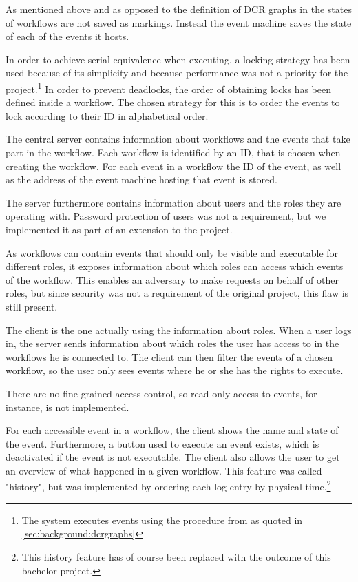 		As mentioned above and as opposed to the definition of DCR graphs in \cite{hildebrandt2011declarative} the states of workflows are not saved as markings. Instead the event machine saves the state of each of the events it hosts.
		
		\newpar In order to achieve serial equivalence when executing, a locking strategy has been used because of its simplicity and because performance was not a priority for the project.\footnote{The system executes events using the procedure from \cite{debois2015concurrency} as quoted in \autoref{sec:background:dcrgraphs}} In order to prevent deadlocks, the order of obtaining locks has been defined inside a workflow. The chosen strategy for this is to order the events to lock according to their ID in alphabetical order.
		
		\newpar The central server contains information about workflows and the events that take part in the workflow. Each workflow is identified by an ID, that is chosen when creating the workflow. For each event in a workflow the ID of the event, as well as the address of the event machine hosting that event is stored.
		
		\newpar The server furthermore contains information about users and the roles they are operating with. Password protection of users was not a requirement, but we implemented it as part of an extension to the project.
		
		\newpar As workflows can contain events that should only be visible and executable for different roles, it exposes information about which roles can access which events of the workflow. This enables an adversary to make requests on behalf of other roles, but since security was not a requirement of the original project, this flaw is still present.
		
		\newpar The client is the one actually using the information about roles. When a user logs in, the server sends information about which roles the user has access to in the workflows he is connected to. The client can then filter the events of a chosen workflow, so the user only sees events where he or she has the rights to execute.
		
		There are no fine-grained access control, so read-only access to events, for instance, is not implemented.
		
		\newpar For each accessible event in a workflow, the client shows the name and state of the event. Furthermore, a button used to execute an event exists, which is deactivated if the event is not executable. The client also allows the user to get an overview of what happened in a given workflow. This feature was called "history", but was implemented by ordering each log entry by physical time.\footnote{This history feature has of course been replaced with the outcome of this bachelor project.}
		
